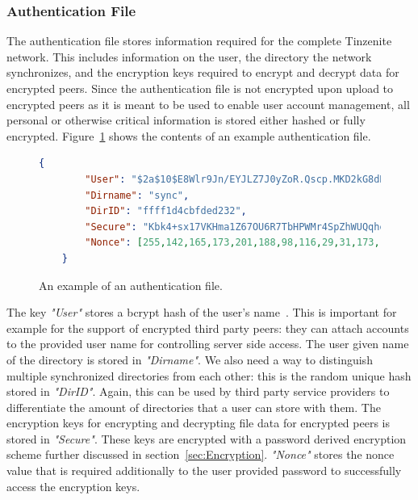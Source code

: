 \subsubsection{Authentication File}
\label{subs:Authentication File}

The authentication file stores information required for the complete Tinzenite network.
This includes information on the user, the directory the network synchronizes, and the encryption keys required to encrypt and decrypt data for encrypted peers.
Since the authentication file is not encrypted upon upload to encrypted peers as it is meant to be used to enable user account management, all personal or otherwise critical information is stored either hashed or fully encrypted.
Figure~\ref{json:auth_object} shows the contents of an example authentication file.

\begin{figure}[htp]
    \begin{lstlisting}[language=json,firstnumber=0]
    {
        "User": "$2a$10$E8Wlr9Jn/EYJLZ7J0yZoR.Qscp.MKD2kG8dHF7OQWYNA1mCfp.Qqe",
        "Dirname": "sync",
        "DirID": "ffff1d4cbfded232",
        "Secure": "Kbk4+sx17VKHma1Z67OU6R7TbHPWMr4SpZhWUQqheS/CNcKKHVYjTTSv0rbF4qDAa0vwikigsm7wHhy4iGjWB84i0ErO7rNwhqrPPxudeDM=",
        "Nonce": [255,142,165,173,201,188,98,116,29,31,173,181,84,84,137,54,159,50,193,248,51,162,76,195]
    }
    \end{lstlisting}
\caption[Authentication JSON Object]{An example of an authentication file.}
\label{json:auth_object}
\end{figure}

The key \textit{"User"} stores a bcrypt hash of the user's name~\cite{web:site:wiki:bcrypt}.
This is important for example for the support of encrypted third party peers: they can attach accounts to the provided user name for controlling server side access.
The user given name of the directory is stored in \textit{"Dirname"}.
We also need a way to distinguish multiple synchronized directories from each other: this is the random unique hash stored in \textit{"DirID"}.
Again, this can be used by third party service providers to differentiate the amount of directories that a user can store with them.
The encryption keys for encrypting and decrypting file data for encrypted peers is stored in \textit{"Secure"}.
These keys are encrypted with a password derived encryption scheme further discussed in section~\ref{sec:Encryption}.
\textit{"Nonce"} stores the nonce value that is required additionally to the user provided password to successfully access the encryption keys.

